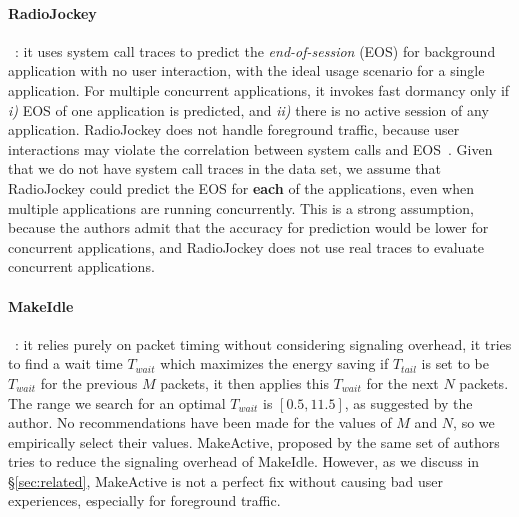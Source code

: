 \paragraph{RadioJockey}~\cite{radiojockey}: it uses system call traces to predict the {\em end-of-session} (EOS) for background application with no user interaction, with the ideal usage scenario for a single application. For multiple concurrent applications, it invokes fast dormancy only if {\em i)} EOS of one application is predicted, and {\em ii)} there is no active session of any application. RadioJockey does not handle foreground traffic, because user interactions may violate the correlation between system calls and EOS~\cite{radiojockey}. Given that we do not have system call traces in the \UMICH data set, we assume that RadioJockey could predict the EOS for {\bf each} of the applications, even when multiple applications are running concurrently. This is a strong assumption, because the authors admit that the accuracy for prediction would be lower for concurrent applications, and RadioJockey does not use real traces to evaluate concurrent applications.

\paragraph{MakeIdle}~\cite{makeidle}: it relies purely on packet timing without considering signaling overhead, \ie it tries to find a wait time $T_{wait}$ which maximizes the energy saving if $T_{tail}$ is set to be $T_{wait}$ for the previous $M$ packets, it then applies this $T_{wait}$ for the next $N$ packets. The range we search for an optimal $T_{wait}$ is $[0.5, 11.5]$, as suggested by the author.  No recommendations have been made for the values of $M$ and $N$, so we empirically select their values. MakeActive, proposed by the same set of authors tries to reduce the signaling overhead of MakeIdle. However, as we discuss in \S\ref{sec:related}, MakeActive is not a perfect fix without causing bad user experiences, especially for foreground traffic.

